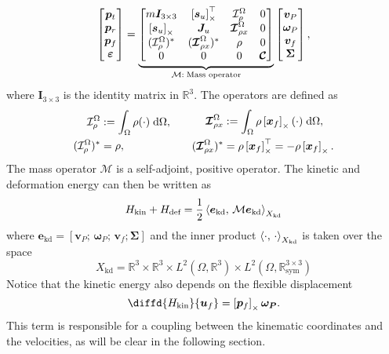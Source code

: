 \begin{equation}
\label{eq:mass_op}
\begin{bmatrix}
\bm{p}_t \\ \bm{p}_r \\ \bm{p}_f \\ \bm\varepsilon \\
\end{bmatrix} = 
\underbrace{\begin{bmatrix}
	m \bm{I}_{3\times 3} & \crmat{\bm{s}_u}^\top & \mathcal{I}_\rho^{\Omega} & 0 \\
	\crmat{\bm{s}_u} & \bm{J}_u & \bm{\mathcal{I}}_{\rho x}^{\Omega} & 0  \\
	(\mathcal{I}_\rho^{\Omega})^* & (\bm{\mathcal{I}}_{\rho x}^{\Omega})^* & \rho & 0  \\
	0 & 0 & 0 & \bm{\mathcal{C}} \\
	\end{bmatrix}}_{{\mathcal{M}}: \; \text{Mass operator}}
\begin{bmatrix}
\bm{v}_P \\ \bm{\omega}_P  \\ \bm{v}_f  \\ \bm\Sigma \\
\end{bmatrix},
\end{equation}
where $\bm{I}_{3\times 3}$ is the identity matrix in $\mathbb{R}^3$. The operators are defined as
\begin{equation*}
\begin{aligned}
\mathcal{I}_\rho^\Omega &:=\int_{\Omega} \rho (\cdot) \d{\Omega}, \\
(\mathcal{I}_\rho^{\Omega})^* &= \rho, \\
\end{aligned} \qquad
\begin{aligned} 
\bm{\mathcal{I}}_{\rho x}^{\Omega} &:= \int_\Omega \rho \crmat{\bm{x}_f} (\cdot) \d{\Omega}, \\
(\bm{\mathcal{I}}_{\rho x}^{\Omega})^* &= \rho \crmat{\bm{x}_f}^\top= -\rho \crmat{\bm{x}_f}. \\
\end{aligned}
\end{equation*}
The mass operator $\mathcal{M}$ is a self-adjoint, positive operator. The kinetic and deformation energy can then be written as
\begin{equation}
H_{\text{kin}} + H_{\text{def}} = \frac{1}{2} \inner[X_{\text{kd}}]{\bm{e}_{\text{kd}}}{{\mathcal{M}} \bm{e}_{\text{kd}}}
\end{equation}
where $\bm{e}_{\text{kd}} = [\bm{v}_P; \, \bm{\omega}_P; \, \bm{v}_f; \bm{\Sigma}]$ and the inner product $\inner[X_{\text{kd}}]{\cdot}{\cdot}$ is taken over the space 
$$ 	X_{\text{kd}} = \mathbb{R}^3 \times \mathbb{R}^3 \times {L}^2(\Omega, \mathbb{R}^3) \times {L}^2(\Omega, \mathbb{R}^{3\times 3}_{\text{sym}})$$ 
Notice that the kinetic energy also depends on the flexible displacement
\[
\diffd{H_{\text{kin}}}{\bm{u}_f} = \crmat{\bm{p}_f} \bm{\omega_{P}}.
\]
This term is responsible for a coupling between the kinematic coordinates and the velocities, as will be clear in the following section. 

